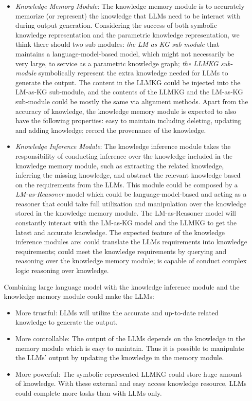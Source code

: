 \begin{itemize}
    \item \textit{Knowledge Memory Module}: The knowledge memory module is to accurately memorize (or represent) the knowledge that LLMs need to be interact with during output generation. Considering the success of both symbolic knowledge representation and the parametric knowledge representation, we think there should two sub-modules: \textit{the LM-as-KG sub-module} that maintains a language-model-based model, which might not necessarily be very large, to service as a parametric knowledge graph; \textit{the LLMKG sub-module} symbolically represent the extra knowledge needed for LLMs to generate the output. The content in the LLMKG could be injected into the LM-as-KG sub-module, and the contents of the LLMKG and the LM-as-KG sub-module could be mostly the same via alignment methods. Apart from the accuracy of knowledge, the knowledge memory module is expected to also have the following properties: easy to maintain including deleting, updating and adding knowledge; record the provenance of the knowledge.  
    \item \textit{Knowledge Inference Module}: The knowledge inference module takes the responsibility of conducting inference over the knowledge included in the knowledge memory module, such as extracting the related knowledge, inferring the missing knowledge, and abstract the relevant knowledge based on the requirements from the LLMs. This module could be composed by a \textit{LM-as-Reasoner} model which could be  language-model-based and acting as a reasoner that could take full utilization and manipulation over the knowledge stored in the knowledge memory module. The LM-as-Reasoner model will constantly interact with the LM-as-KG model and the LLMKG to get the latest and accurate knowledge. The expected feature of the knowledge inference modules are: could translate the LLMs requirements into knowledge requirements; could meet the knowledge requirements by querying and reasoning over the knowledge memory module; is capable of conduct complex logic reasoning over knowledge.  
\end{itemize}

Combining large language model with the knowledge inference module and the knowledge memory module could make the LLMs:
\begin{itemize}
    \item More trustful: LLMs will utilize the accurate and up-to-date related knowledge to generate the output.  
    \item More controllable: The output of the LLMs depends on the knowledge in the memory module which is easy to maintain. Thus it is possible to manipulate the LLMs' output by updating the knowledge in the memory module. 
    \item More powerful: The symbolic represented LLMKG could store huge amount of knowledge. With these external and easy access knowledge resource, LLMs could complete more tasks than with LLMs only.  
\end{itemize}


